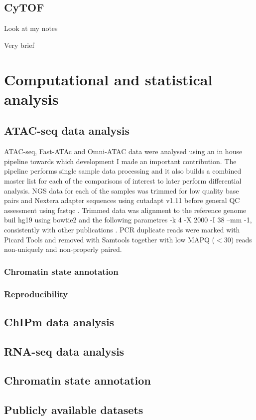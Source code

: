 \subsection{CyTOF}

Look at my notes

Very brief

\section{Computational and statistical analysis}
\subsection{ATAC-seq data analysis}
ATAC-seq, Fast-ATAc and Omni-ATAC data were analysed using an in house pipeline towards which development I made an important contribution. The pipeline performs single sample data processing and it also builds a combined master list for each of the comparisons of interest to later perform differential analysis. 
NGS data for each of the samples was trimmed for low quality base pairs and Nextera adapter sequences using cutadapt v1.11 \parencite{} before general QC assessment using fastqc \parencite{}. Trimmed data was alignment to the reference genome buil hg19 using bowtie2 \parencite{} and the following parametres -k 4 -X 2000 -I 38 --mm -1, consistently with other publications \parencite{Buenrostro2013, Corces2016}. PCR duplicate reads were marked with Picard Tools \parencite{} and removed with Samtools \parencite{} together with low MAPQ  (${<}$30) reads non-uniquely and non-properly paired.





		\subsubsection{Chromatin state annotation}
		\subsubsection{Reproducibility}
	
		
\subsection{ChIPm data analysis}

\subsection{RNA-seq data analysis}

\subsection{Chromatin state annotation}

\subsection{Publicly available datasets}

